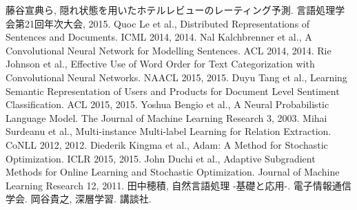 
\begin{thebibliography}{9}
  藤谷宣典ら,
  隠れ状態を用いたホテルレビューのレーティング予測.
  言語処理学会第21回年次大会, 2015.
  Quoc Le et al.,
  Distributed Representations of Sentences and Documents.
  ICML 2014, 2014.
  Nal Kalchbrenner et al.,
  A Convolutional Neural Network for Modelling Sentences.
  ACL 2014, 2014.
  Rie Johnson et al.,
  Effective Use of Word Order for Text Categorization
  with Convolutional Neural Networks.
  NAACL 2015, 2015.
  Duyu Tang et al.,
  Learning Semantic Representation of Users and Products
  for Document Level Sentiment Classification.
  ACL 2015, 2015.
  Yoshua Bengio et al.,
  A Neural Probabilistic Language Model.
  The Journal of Machine Learning Research 3, 2003.
  Mihai Surdeanu et al.,
  Multi-instance Multi-label Learning for Relation Extraction.
  CoNLL 2012, 2012.
  Diederik Kingma et al.,
  Adam: A Method for Stochastic Optimization.
  ICLR 2015, 2015.
  John Duchi et al.,
  Adaptive Subgradient Methods for Online Learning and Stochastic Optimization.
  Journal of Machine Learning Research 12, 2011.
  田中穂積,
  自然言語処理 -基礎と応用-.
  電子情報通信学会.
  岡谷貴之,
  深層学習.
  講談社.
\end{thebibliography}
